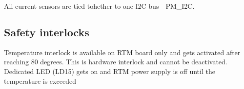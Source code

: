 All current sensors are tied tohether to one I2C bus - PM\_I2C. \\

\subsection{Safety interlocks}


Temperature interlock is available on RTM board only and gets activated after reaching 80 degrees. This is hardware interlock and cannot be deactivated. Dedicated LED (LD15) gets on and RTM power supply is off until the temperature is exceeded